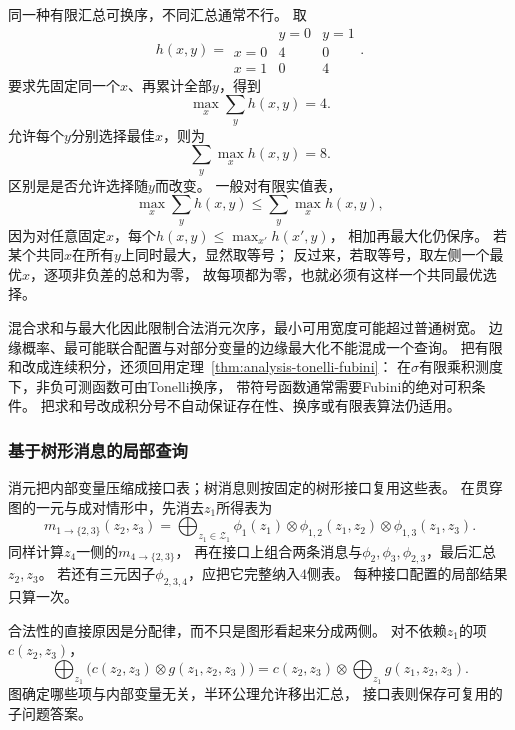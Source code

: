 同一种有限汇总可换序，不同汇总通常不行。
取
\[
  h(x,y)=
  \begin{array}{c|cc}
    &y=0&y=1\\ \hline
    x=0&4&0\\
    x=1&0&4
  \end{array}.
\]
要求先固定同一个\(x\)、再累计全部\(y\)，得到
\begin{equation}
  \max_x\sum_yh(x,y)=4.
  \label{eq:graph-theory-max-sum-order-a}
\end{equation}
允许每个\(y\)分别选择最佳\(x\)，则为
\begin{equation}
  \sum_y\max_xh(x,y)=8.
  \label{eq:graph-theory-max-sum-order-b}
\end{equation}
区别是是否允许选择随\(y\)而改变。
一般对有限实值表，
\[
  \max_x\sum_yh(x,y)\leq\sum_y\max_xh(x,y),
\]
因为对任意固定\(x\)，每个\(h(x,y)\leq\max_{x'}h(x',y)\)，
相加再最大化仍保序。
若某个共同\(x\)在所有\(y\)上同时最大，显然取等号；
反过来，若取等号，取左侧一个最优\(x\)，逐项非负差的总和为零，
故每项都为零，也就必须有这样一个共同最优选择。

混合求和与最大化因此限制合法消元次序，最小可用宽度可能超过普通树宽。
边缘概率、最可能联合配置与对部分变量的边缘最大化不能混成一个查询。
把有限和改成连续积分，还须回用定理~\ref{thm:analysis-tonelli-fubini}：
在\(\sigma\)有限乘积测度下，非负可测函数可由Tonelli换序，
带符号函数通常需要Fubini的绝对可积条件。
把求和号改成积分号不自动保证存在性、换序或有限表算法仍适用。

\subsubsection{基于树形消息的局部查询}

消元把内部变量压缩成接口表；树消息则按固定的树形接口复用这些表。
在贯穿图的一元与成对情形中，先消去\(z_1\)所得表为
\begin{equation}
  m_{1\to\{2,3\}}(z_2,z_3)=
  \bigoplus_{z_1\in\mathcal Z_1}
  \phi_1(z_1)\otimes\phi_{1,2}(z_1,z_2)\otimes\phi_{1,3}(z_1,z_3).
  \label{eq:graph-theory-interface-message}
\end{equation}
同样计算\(z_4\)一侧的\(m_{4\to\{2,3\}}\)，
再在接口上组合两条消息与\(\phi_2,\phi_3,\phi_{2,3}\)，最后汇总\(z_2,z_3\)。
若还有三元因子\(\phi_{2,3,4}\)，应把它完整纳入\(4\)侧表。
每种接口配置的局部结果只算一次。

合法性的直接原因是分配律，而不只是图形看起来分成两侧。
对不依赖\(z_1\)的项\(c(z_2,z_3)\)，
\[
  \bigoplus_{z_1}\bigl(c(z_2,z_3)\otimes g(z_1,z_2,z_3)\bigr)
  =c(z_2,z_3)\otimes\bigoplus_{z_1}g(z_1,z_2,z_3).
\]
图确定哪些项与内部变量无关，半环公理允许移出汇总，
接口表则保存可复用的子问题答案。

